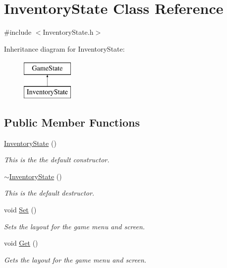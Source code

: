 \hypertarget{classInventoryState}{\section{Inventory\-State Class Reference}
\label{classInventoryState}
}


{\ttfamily \#include $<$Inventory\-State.\-h$>$}

Inheritance diagram for Inventory\-State\-:\begin{figure}[H]
\begin{center}
\leavevmode
\includegraphics[height=2.000000cm]{classInventoryState}
\end{center}
\end{figure}
\subsection*{Public Member Functions}
\begin{DoxyCompactItemize}
\item 
\hyperlink{classInventoryState_ae30417cdbbea88bb6b396767a7c59da6}{Inventory\-State} ()
\begin{DoxyCompactList}\small\item\em This is the the default constructor. \end{DoxyCompactList}\item 
\hyperlink{classInventoryState_a50f492ed158b775a07ceb1af4a52c656}{$\sim$\-Inventory\-State} ()
\begin{DoxyCompactList}\small\item\em This is the default destructor. \end{DoxyCompactList}\item 
void \hyperlink{classInventoryState_a47936e9d5683d344e87f3da176e97e4b}{Set} ()
\begin{DoxyCompactList}\small\item\em Sets the layout for the game menu and screen. \end{DoxyCompactList}\item 
void \hyperlink{classInventoryState_a9358c4937e5bfe24017ac8985d56ed06}{Get} ()
\begin{DoxyCompactList}\small\item\em Gets the layout for the game menu and screen. \end{DoxyCompactList}\end{DoxyCompactItemize}
